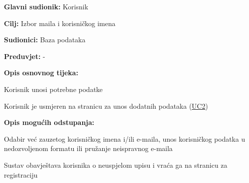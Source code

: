 					\noindent {}
					\begin{packed_item}
	
						\item \textbf{Glavni sudionik:} Korisnik
						\item  \textbf{Cilj:} Izbor maila i korisničkog imena
						\item  \textbf{Sudionici:} Baza podataka
						\item  \textbf{Preduvjet:} -
						\item  \textbf{Opis osnovnog tijeka:}
						
						\item[] \begin{packed_enum}
	
							\item Korisnik unosi potrebne podatke
							\item Korisnik je usmjeren na stranicu za unos dodatnih podataka (\hyperref[UC2] {UC2})
							
						\end{packed_enum}
						
						\item  \textbf{Opis mogućih odstupanja:}
						
						\item[] \begin{packed_item}
	
							\item[1.a] Odabir već zauzetog korisničkog imena i/ili e-maila, unos korisničkog podatka u nedozvoljenom formatu ili pružanje neispravnog e-maila
							\item[] \begin{packed_enum}
								
								\item Sustav obavještava korisnika o neuspjelom upisu i vraća ga na stranicu za registraciju
								
							\end{packed_enum}
							
						\end{packed_item}
					\end{packed_item}
									
